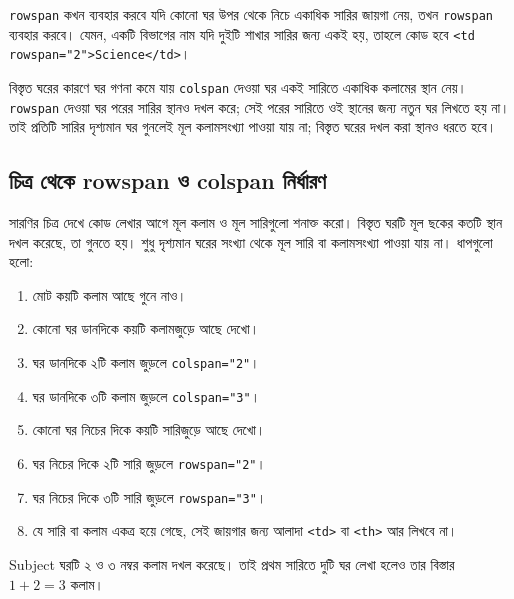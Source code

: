 \begin{boardbox}{\texttt{rowspan} কখন ব্যবহার করবে}
যদি কোনো ঘর উপর থেকে নিচে একাধিক সারির জায়গা নেয়, তখন \texttt{rowspan} ব্যবহার করবে। যেমন, একটি বিভাগের নাম যদি দুইটি শাখার সারির জন্য একই হয়, তাহলে কোড হবে \texttt{<td rowspan="2">Science</td>}।
\end{boardbox}

\begin{keypointbox}{বিস্তৃত ঘরের কারণে ঘর গণনা কমে যায়}
\texttt{colspan} দেওয়া ঘর একই সারিতে একাধিক কলামের স্থান নেয়। \texttt{rowspan} দেওয়া ঘর পরের সারির স্থানও দখল করে; সেই পরের সারিতে ওই স্থানের জন্য নতুন ঘর লিখতে হয় না। তাই প্রতিটি সারির দৃশ্যমান ঘর গুনলেই মূল কলামসংখ্যা পাওয়া যায় না; বিস্তৃত ঘরের দখল করা স্থানও ধরতে হবে।
\end{keypointbox}


\subsection{চিত্র থেকে rowspan ও colspan নির্ধারণ}

সারণির চিত্র দেখে কোড লেখার আগে মূল কলাম ও মূল সারিগুলো শনাক্ত করো। বিস্তৃত ঘরটি মূল ছকের কতটি স্থান দখল করেছে, তা গুনতে হয়। শুধু দৃশ্যমান ঘরের সংখ্যা থেকে মূল সারি বা কলামসংখ্যা পাওয়া যায় না। ধাপগুলো হলো:

\begin{enumerate}
\item মোট কয়টি কলাম আছে গুনে নাও।
\item কোনো ঘর ডানদিকে কয়টি কলামজুড়ে আছে দেখো।
\item ঘর ডানদিকে ২টি কলাম জুড়লে \texttt{colspan="2"}।
\item ঘর ডানদিকে ৩টি কলাম জুড়লে \texttt{colspan="3"}।
\item কোনো ঘর নিচের দিকে কয়টি সারিজুড়ে আছে দেখো।
\item ঘর নিচের দিকে ২টি সারি জুড়লে \texttt{rowspan="2"}।
\item ঘর নিচের দিকে ৩টি সারি জুড়লে \texttt{rowspan="3"}।
\item যে সারি বা কলাম একত্র হয়ে গেছে, সেই জায়গার জন্য আলাদা \texttt{<td>} বা \texttt{<th>} আর লিখবে না।
\end{enumerate}

\begin{center}
\end{center}
Subject ঘরটি ২ ও ৩ নম্বর কলাম দখল করেছে। তাই প্রথম সারিতে দুটি ঘর লেখা হলেও তার বিস্তার $1+2=3$ কলাম।

